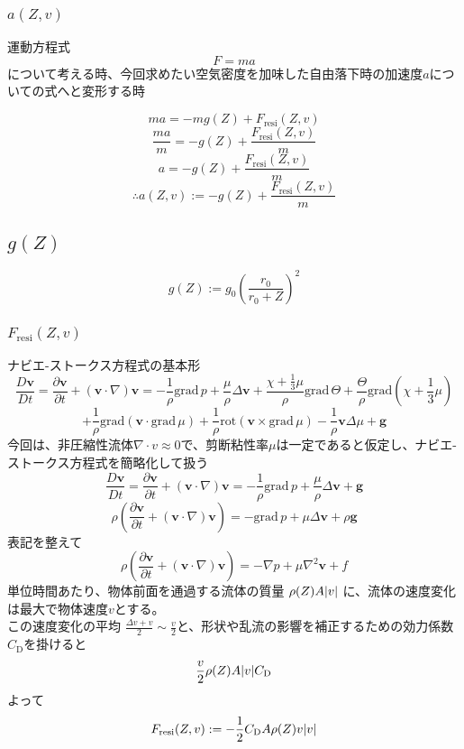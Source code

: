 \documentclass[a4paper,12pt]{article}
\begin{document}
\subsubsection{$a(Z, v)$}
運動方程式
\[
  F = ma
\]
について考える時、今回求めたい空気密度を加味した自由落下時の加速度$a$についての式へと変形する時

\[
  ma = -mg(Z) + F_{\mathrm{resi}}(Z, v)
\]
\[
  \frac{ma}{m} = -g(Z) + \frac{F_{\mathrm{resi}}(Z, v)}{m}
\]
\[
  a = -g(Z) + \frac{F_{\mathrm{resi}}(Z, v)}{m}
\]
\[
  \therefore a(Z, v) := -g(Z) + \frac{F_{\mathrm{resi}}(Z, v)}{m}
\]

\subsection{$g(Z)$}

\[
  g(Z) := g_0\left(\frac{r_0}{r_0+Z}\right)^2
\]
\subsubsection{$F_{\mathrm{resi}}(Z, v)$}
ナビエ-ストークス方程式の基本形
\[
\frac{D\boldsymbol{v}}{Dt} = \frac{\partial \boldsymbol{v}}{\partial t} + \left(\boldsymbol{v} \cdot \nabla\right)\boldsymbol{v} = -\frac{1}{\rho}\mathrm{grad}\,p + \frac{\mu}{\rho}\Delta\boldsymbol{v} + \frac{\chi + \frac{1}{3}\mu}{\rho}\mathrm{grad}\,\Theta + \frac{\Theta}{\rho}\mathrm{grad}\left(\chi + \frac{1}{3}\mu\right)
\]
\[
+ \frac{1}{\rho}\mathrm{grad}\left(\boldsymbol{v} \cdot \mathrm{grad}\,\mu\right) + \frac{1}{\rho}\mathrm{rot}\left(\boldsymbol{v} \times \mathrm{grad}\,\mu\right) - \frac{1}{\rho}\boldsymbol{v}\Delta\mu + \boldsymbol{g}
\]
今回は、非圧縮性流体$\nabla\cdot v \approx 0$で、剪断粘性率$\mu$は一定であると仮定し、ナビエ-ストークス方程式を簡略化して扱う
\[
  \frac{D\boldsymbol{v}}{Dt} = \frac{\partial \boldsymbol{v}}{\partial t} + \left(\boldsymbol{v} \cdot \nabla\right)\boldsymbol{v} = -\frac{1}{\rho}\mathrm{grad}\,p + \frac{\mu}{\rho}\Delta\boldsymbol{v} + \boldsymbol{g}
\]
\[
  \rho\left(\frac{\partial \boldsymbol{v}}{\partial t} + \left(\boldsymbol{v} \cdot \nabla\right)\boldsymbol{v}\right) = -\mathrm{grad}\,p + \mu\Delta\boldsymbol{v} + \rho\boldsymbol{g}
\]
表記を整えて
\[
  \rho\left(\frac{\partial \boldsymbol{v}}{\partial t} + \left(\boldsymbol{v} \cdot \nabla\right)\boldsymbol{v}\right)= -\nabla p + \mu \nabla^2\boldsymbol{v} + f
\]
単位時間あたり、物体前面を通過する流体の質量 $\rho(Z)A\abs{v}$ に、流体の速度変化は最大で物体速度$v$とする。\\
この速度変化の平均 $\frac{\Delta v + v}{2} \sim \frac{v}{2}$と、形状や乱流の影響を補正するための効力係数$C_\mathrm{D}$を掛けると
\[
  \frac{v}{2}\rho(Z)A\abs{v}C_\mathrm{D}
\]
よって
\[
  F_{\mathrm{resi}}(Z, v) := -\frac{1}{2}C_{\mathrm{D}}A\rho(Z)v\abs{v}
\]
\end{document}
